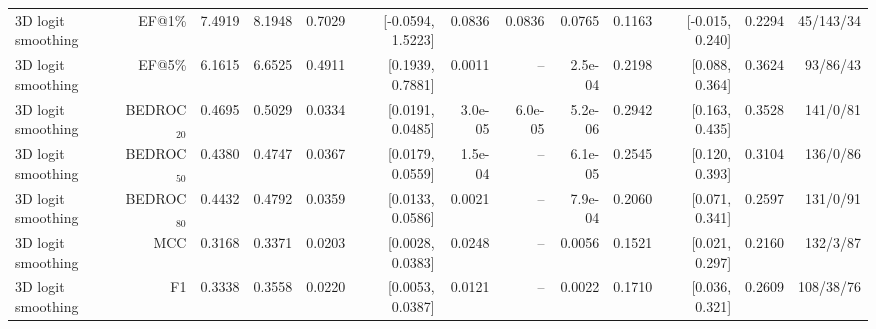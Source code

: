 \begin{table}[t]
\begin{tabular}{lrrrrrrrrrrrr}
3D logit smoothing & EF@1\% & 7.4919 & 8.1948 & 0.7029 & [-0.0594, 1.5223] & 0.0836 & 0.0836 & 0.0765 & 0.1163 & [-0.015, 0.240] & 0.2294 & 45/143/34 \\
3D logit smoothing & EF@5\% & 6.1615 & 6.6525 & 0.4911 & [0.1939, 0.7881] & 0.0011 & -- & 2.5e-04 & 0.2198 & [0.088, 0.364] & 0.3624 & 93/86/43 \\
3D logit smoothing & BEDROC$_{20}$ & 0.4695 & 0.5029 & 0.0334 & [0.0191, 0.0485] & 3.0e-05 & 6.0e-05 & 5.2e-06 & 0.2942 & [0.163, 0.435] & 0.3528 & 141/0/81 \\
3D logit smoothing & BEDROC$_{50}$ & 0.4380 & 0.4747 & 0.0367 & [0.0179, 0.0559] & 1.5e-04 & -- & 6.1e-05 & 0.2545 & [0.120, 0.393] & 0.3104 & 136/0/86 \\
3D logit smoothing & BEDROC$_{80}$ & 0.4432 & 0.4792 & 0.0359 & [0.0133, 0.0586] & 0.0021 & -- & 7.9e-04 & 0.2060 & [0.071, 0.341] & 0.2597 & 131/0/91 \\
3D logit smoothing & MCC & 0.3168 & 0.3371 & 0.0203 & [0.0028, 0.0383] & 0.0248 & -- & 0.0056 & 0.1521 & [0.021, 0.297] & 0.2160 & 132/3/87 \\
3D logit smoothing & F1 & 0.3338 & 0.3558 & 0.0220 & [0.0053, 0.0387] & 0.0121 & -- & 0.0022 & 0.1710 & [0.036, 0.321] & 0.2609 & 108/38/76 \\
\bottomrule
\end{tabular}
\end{table}
